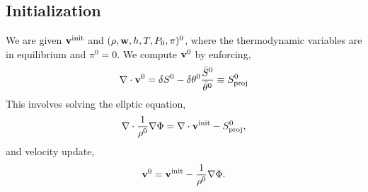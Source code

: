 \documentclass[final]{siamltex}
\def\vb {{\bf v}}
\def\wb {{\bf w}}
\begin{document}
\subsection{Initialization}
We are given $\vb^{\rm init}$ and $(\rho,\wb,h,T,P_0,\pi)^0$,
where the thermodynamic variables are in equilibrium
and $\pi^0=0$.  We compute $\vb^0$ by enforcing,
\begin{equation}
\nabla\cdot\vb^0 = \delta S^0 - \delta\theta^0\frac{\bar{S}^0}{\bar{\theta}^0} \equiv S_{\rm proj}^0
\end{equation}
This involves solving the ellptic equation,
\begin{equation}
\nabla\cdot\frac{1}{\rho^0}\nabla\Phi = \nabla\cdot\vb^{\rm init} - S_{\rm proj}^0,
\end{equation}
and velocity update,
\begin{equation}
\vb^0 = \vb^{\rm init} - \frac{1}{\rho^0}\nabla\Phi.
\end{equation}
\end{document}
